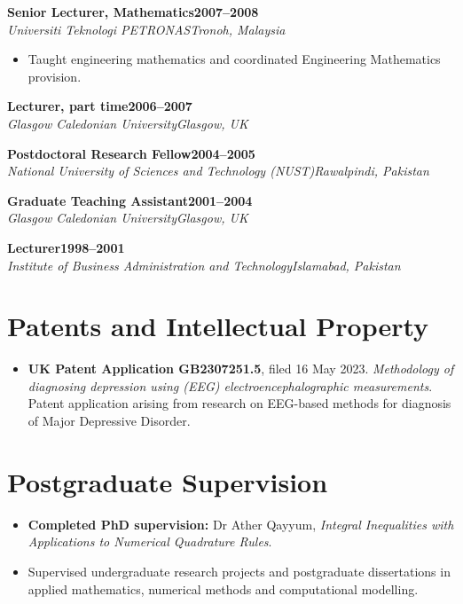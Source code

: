 \documentclass[10pt,a4paper]{article}
\newcommand{\cvrole}[4]{\textbf{#1}\hfill\textbf{#2}\\[-1pt]\textit{#3}\hfill\textit{#4}\par}
\begin{document}
\cvrole{Senior Lecturer, Mathematics}{2007--2008}{Universiti Teknologi PETRONAS}{Tronoh, Malaysia}
\begin{itemize}\item Taught engineering mathematics and coordinated Engineering Mathematics provision.\end{itemize}
\cvrole{Lecturer, part time}{2006--2007}{Glasgow Caledonian University}{Glasgow, UK}
\cvrole{Postdoctoral Research Fellow}{2004--2005}{National University of Sciences and Technology (NUST)}{Rawalpindi, Pakistan}
\cvrole{Graduate Teaching Assistant}{2001--2004}{Glasgow Caledonian University}{Glasgow, UK}
\cvrole{Lecturer}{1998--2001}{Institute of Business Administration and Technology}{Islamabad, Pakistan}

\section{Patents and Intellectual Property}
\begin{itemize}
\item \textbf{UK Patent Application GB2307251.5}, filed 16 May 2023. \textit{Methodology of diagnosing depression using (EEG) electroencephalographic measurements}. Patent application arising from research on EEG-based methods for diagnosis of Major Depressive Disorder.
\end{itemize}



\section{Postgraduate Supervision}
\begin{itemize}
\item \textbf{Completed PhD supervision:} Dr Ather Qayyum, \textit{Integral Inequalities with Applications to Numerical Quadrature Rules}.
\item Supervised undergraduate research projects and postgraduate dissertations in applied mathematics, numerical methods and computational modelling.
\end{itemize}
\end{document}
